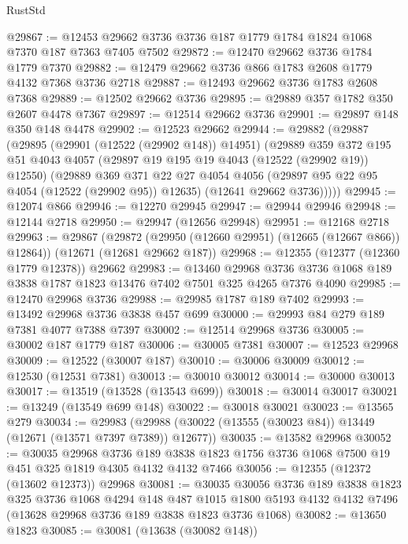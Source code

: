 \begin{lexlean}{RustStd}
\begin{coremodule}
@29867 := @12453 @29662 @3736 @3736 @187 @1779 @1784 @1824 @1068 @7370 @187 @7363 @7405 @7502
@29872 := @12470 @29662 @3736 @1784 @1779 @7370
@29882 := @12479 @29662 @3736 @866 @1783 @2608 @1779 @4132 @7368 @3736 @2718
@29887 := @12493 @29662 @3736 @1783 @2608 @7368
@29889 := @12502 @29662 @3736
@29895 := @29889 @357 @1782 @350 @2607 @4478 @7367
@29897 := @12514 @29662 @3736
@29901 := @29897 @148 @350 @148 @4478
@29902 := @12523 @29662
@29944 := @29882
    (@29887
      (@29895
        (@29901 (@12522 (@29902 @148)) @14951)
        (@29889
          @359
          @372
          @195
          @51
          @4043
          @4057
          (@29897 @19 @195 @19 @4043 (@12522 (@29902 @19)) @12550)
          (@29889
            @369
            @371
            @22
            @27
            @4054
            @4056
            (@29897 @95 @22 @95 @4054 (@12522 (@29902 @95)) @12635)
            (@12641 @29662 @3736)))))
@29945 := @12074 @866
@29946 := @12270 @29945
@29947 := @29944 @29946
@29948 := @12144 @2718
@29950 := @29947 (@12656 @29948)
@29951 := @12168 @2718
@29963 := @29867
    (@29872 (@29950 (@12660 @29951) (@12665 (@12667 @866)) @12864))
    (@12671 (@12681 @29662 @187))
@29968 := @12355 (@12377 (@12360 @1779 @12378)) @29662
@29983 := @13460
    @29968
    @3736
    @3736
    @1068
    @189
    @3838
    @1787
    @1823
    @13476
    @7402
    @7501
    @325
    @4265
    @7376
    @4090
@29985 := @12470 @29968 @3736
@29988 := @29985 @1787 @189 @7402
@29993 := @13492 @29968 @3736 @3838 @457 @699
@30000 := @29993 @84 @279 @189 @7381 @4077 @7388 @7397
@30002 := @12514 @29968 @3736
@30005 := @30002 @187 @1779 @187
@30006 := @30005 @7381
@30007 := @12523 @29968
@30009 := @12522 (@30007 @187)
@30010 := @30006 @30009
@30012 := @12530 (@12531 @7381)
@30013 := @30010 @30012
@30014 := @30000 @30013
@30017 := @13519 (@13528 (@13543 @699))
@30018 := @30014 @30017
@30021 := @13249 (@13549 @699 @148)
@30022 := @30018 @30021
@30023 := @13565 @279
@30034 := @29983 (@29988 (@30022 (@13555 (@30023 @84)) @13449 (@12671 (@13571 @7397 @7389)) @12677))
@30035 := @13582 @29968
@30052 := @30035
    @29968
    @3736
    @189
    @3838
    @1823
    @1756
    @3736
    @1068
    @7500
    @19
    @451
    @325
    @1819
    @4305
    @4132
    @4132
    @7466
@30056 := @12355 (@12372 (@13602 @12373)) @29968
@30081 := @30035
    @30056
    @3736
    @189
    @3838
    @1823
    @325
    @3736
    @1068
    @4294
    @148
    @487
    @1015
    @1800
    @5193
    @4132
    @4132
    @7496
    (@13628 @29968 @3736 @189 @3838 @1823 @3736 @1068)
@30082 := @13650 @1823
@30085 := @30081 (@13638 (@30082 @148))

\end{coremodule}
\end{lexlean}
